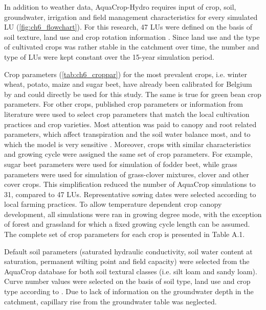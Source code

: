In addition to weather data, AquaCrop-Hydro requires input of crop, soil, groundwater, irrigation and field management characteristics for every simulated LU (\autoref{fig:ch6_flowchart}). For this research, 47 LUs were defined on the basis of soil texture, land use and crop rotation information \parencite{agiv2014,agiv2001,dov2014,vlm2014}. Since land use and the type of cultivated crops was rather stable in the catchment over time, the number and type of LUs were kept constant over the 15-year simulation period. 

Crop parameters (\autoref{tab:ch6_croppar}) for the most prevalent crops, i.e. winter wheat, potato, maize and sugar beet, have already been calibrated for Belgium by \textcite{vanuytrecht2013,vanuytrecht2015, vanuytrecht2014} and could directly be used for this study. The same is true for green bean crop parameters. For other crops, published crop parameters or information from literature \parencite{abrha2012, allen1998, paredes2013, vanuytrecht2013} were used to select crop parameters that match the local cultivation practices and crop varieties. Most attention was paid to canopy and root related parameters, which affect transpiration and the soil water balance most, and to which the model is very sensitive \parencite{vanuytrecht2014b}. Moreover, crops with similar characteristics and growing cycle were assigned the same set of crop parameters. For example, sugar beet parameters were used for simulation of fodder beet, while grass parameters were used for simulation of grass-clover mixtures, clover and other cover crops. This simplification reduced the number of AquaCrop simulations to 31, compared to 47 LUs. Representative sowing dates were selected according to local farming practices. To allow temperature dependent crop canopy development, all simulations were ran in growing degree mode, with the exception of forest and grassland for which a fixed growing cycle length can be assumed. The complete set of crop parameters for each crop is presented in Table A.1.

Default soil parameters (saturated hydraulic conductivity, soil water content at saturation, permanent wilting point and field capacity) were selected from the AquaCrop database for both soil textural classes (i.e. silt loam and sandy loam). Curve number values were selected on the basis of soil type, land use and crop type according to \textcite{usda2007}. Due to lack of information on the groundwater depth in the catchment, capillary rise from the groundwater table was neglected.

